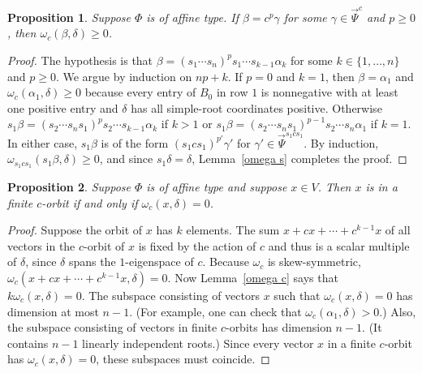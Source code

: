 \documentclass{amsart}
\newtheorem{proposition}{Proposition}[section]
\theoremstyle{definition}
\theoremstyle{remark}
\numberwithin{equation}{section}
\newcommand{\set}[1]{{\lbrace #1 \rbrace}}
\newcommand{\0}{{\mathbf{0}}}
\newcommand{\RSChar}{\Phi}
\newcommand{\RS}{\RSChar}
\newcommand{\TravInfChar}{\Psi}
\newcommand{\TravProj}[1]{\overrightarrow{\TravInfChar}^{#1}}
\begin{document}
\begin{proposition}\label{om del}
Suppose $\RS$ is of affine type.
If $\beta=c^p\gamma$ for some $\gamma\in\TravProj{c}$ and $p\ge0$, then $\omega_c(\beta,\delta)\ge0$. 
\end{proposition}
\begin{proof}
The hypothesis is that $\beta=(s_1\cdots s_n)^ps_1\cdots s_{k-1}\alpha_k$ for some $k\in\set{1,\ldots,n}$ and $p\ge0$.
We argue by induction on $np+k$.
If $p=0$ and $k=1$, then $\beta=\alpha_1$ and $\omega_c(\alpha_1,\delta)\ge0$ because every entry of $B_0$ in row $1$ is nonnegative with at least one positive entry and $\delta$ has all simple-root coordinates positive.
Otherwise $s_1\beta=(s_2\cdots s_ns_1)^ps_2\cdots s_{k-1}\alpha_k$ if $k>1$ or $s_1\beta=(s_2\cdots s_ns_1)^{p-1}s_2\cdots s_n\alpha_1$ if $k=1$.
In either case, $s_1\beta$ is of the form $(s_1cs_1)^{p'}\gamma'$ for $\gamma'\in\TravProj{s_1cs_1}$.
By induction, $\omega_{s_1cs_1}(s_1\beta,\delta)\ge0$, and since $s_1\delta=\delta$, Lemma~\ref{omega s} completes the proof.
\end{proof}


\begin{proposition}\label{om del fin}
Suppose $\RS$ is of affine type and suppose $x\in V$.
Then $x$ is in a finite $c$-orbit if and only if $\omega_c(x,\delta)=0$.
\end{proposition}
\begin{proof}
Suppose the orbit of $x$ has $k$ elements.
The sum $x+cx+\cdots+c^{k-1}x$ of all vectors in the $c$-orbit of $x$ is fixed by the action of $c$ and thus is a scalar multiple of $\delta$, since $\delta$ spans the $1$-eigenspace of $c$.
Because $\omega_c$ is skew-symmetric, $\omega_c(x+cx+\cdots+c^{k-1}x,\delta)=0$.
Now Lemma~\ref{omega c} says that $k\omega_c(x,\delta)=0$.
The subspace consisting of vectors $x$ such that $\omega_c(x,\delta)=0$ has dimension at most $n-1$.
(For example, one can check that $\omega_c(\alpha_1,\delta)>0$.)
Also, the subspace consisting of vectors in finite $c$-orbits has dimension $n-1$.
(It contains $n-1$ linearly independent roots.)
Since every vector $x$ in a finite $c$-orbit has $\omega_c(x,\delta)=0$, these subspaces must coincide.
\end{proof}
\end{document}
